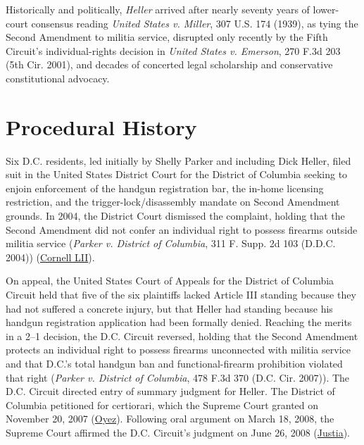 \documentclass[12pt]{article}
\begin{document}
Historically and politically, \textit{Heller} arrived after nearly seventy years of lower-court consensus reading \textit{United States v. Miller}, 307 U.S. 174 (1939), as tying the Second Amendment to militia service, disrupted only recently by the Fifth Circuit's individual-rights decision in \textit{United States v. Emerson}, 270 F.3d 203 (5th Cir. 2001), and decades of concerted legal scholarship and conservative constitutional advocacy.

\section{Procedural History}
Six D.C. residents, led initially by Shelly Parker and including Dick Heller, filed suit in the United States District Court for the District of Columbia seeking to enjoin enforcement of the handgun registration bar, the in-home licensing restriction, and the trigger-lock/disassembly mandate on Second Amendment grounds. In 2004, the District Court dismissed the complaint, holding that the Second Amendment did not confer an individual right to possess firearms outside militia service (\textit{Parker v. District of Columbia}, 311 F. Supp. 2d 103 (D.D.C. 2004)) (\href{https://www.law.cornell.edu/supct/html/07-290.ZO.html}{Cornell LII}).

On appeal, the United States Court of Appeals for the District of Columbia Circuit held that five of the six plaintiffs lacked Article III standing because they had not suffered a concrete injury, but that Heller had standing because his handgun registration application had been formally denied. Reaching the merits in a 2--1 decision, the D.C. Circuit reversed, holding that the Second Amendment protects an individual right to possess firearms unconnected with militia service and that D.C.'s total handgun ban and functional-firearm prohibition violated that right (\textit{Parker v. District of Columbia}, 478 F.3d 370 (D.C. Cir. 2007)). The D.C. Circuit directed entry of summary judgment for Heller. The District of Columbia petitioned for certiorari, which the Supreme Court granted on November 20, 2007 (\href{https://www.oyez.org/cases/2007/07-290}{Oyez}). Following oral argument on March 18, 2008, the Supreme Court affirmed the D.C. Circuit's judgment on June 26, 2008 (\href{https://supreme.justia.com/cases/federal/us/554/570/}{Justia}).
\end{document}
